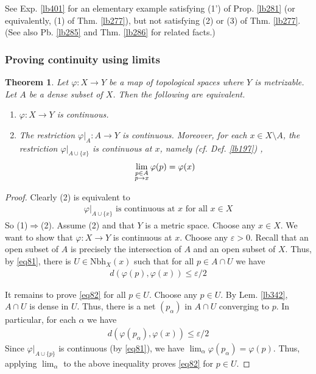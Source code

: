 \documentclass[12pt,b5paper,notitlepage]{article}
\theoremstyle{definition}
\theoremstyle{plain}
\newtheorem{thm}[df]{Theorem}
\newcommand{\Nbh}{\mathrm{Nbh}}
\newcommand{\eps}{\varepsilon}
\numberwithin{equation}{section}
\begin{document}
See Exp. \ref{lb401} for an elementary example satisfying (1') of Prop. \ref{lb281} (or equivalently, (1) of Thm. \ref{lb277}), but not satisfying (2) or (3) of Thm. \ref{lb277}. (See also Pb. \ref{lb285} and Thm. \ref{lb286} for related facts.)






\subsubsection{Proving continuity using limits}



\begin{thm}\label{lb276}
Let $\varphi:X\rightarrow Y$ be a map of topological spaces where $Y$ is metrizable. Let $A$ be a dense subset of $X$. Then the following are equivalent.
\begin{enumerate}[label=(\arabic*)]
\item $\varphi:X\rightarrow Y$ is continuous.
\item The restriction $\varphi|_A:A\rightarrow Y$ is continuous. Moreover, for each $x\in X\setminus A$, the restriction $\varphi|_{A\cup\{x\}}$ is continuous at $x$, namely (cf. Def. \ref{lb197}) ,
\begin{align}
\lim_{
\begin{subarray}{c}
p\in A\\
p\rightarrow x
\end{subarray}
}\varphi(p)=\varphi(x)
\end{align}
\end{enumerate}
\end{thm}




\begin{proof}
Clearly (2) is equivalent to
\begin{align}\label{eq81}
\varphi|_{A\cup\{x\}}\text{ is continuous at $x$ for all $x\in X$}
\end{align}
So (1)$\Rightarrow$(2). Assume (2) and that $Y$ is a metric space. Choose any $x\in X$. We want to show that $\varphi:X\rightarrow Y$ is continuous at $x$. Choose any $\eps>0$. Recall that an open subset of $A$ is precisely the intersection of $A$ and an open subset of $X$. Thus, by \eqref{eq81}, there is $U\in\Nbh_X(x)$ such that for all $p\in A\cap U$ we have
\begin{align}
d(\varphi(p),\varphi(x))\leq \eps/2\label{eq82}
\end{align}


It remains to prove \eqref{eq82} for all $p\in U$. Choose any $p\in U$. By Lem. \ref{lb342}, $A\cap U$ is dense in $U$.  Thus, there is a net $(p_\alpha)$ in $A\cap U$ converging to $p$. In particular, for each $\alpha$ we have
\begin{align*}
d(\varphi(p_\alpha),\varphi(x))\leq \eps/2
\end{align*}
Since $\varphi|_{A\cup\{p\}}$ is continuous (by \eqref{eq81}), we have $\lim_\alpha\varphi(p_\alpha)=\varphi(p)$. Thus, applying $\lim_\alpha$ to the above inequality proves \eqref{eq82} for $p\in U$.
\end{proof}
\end{document}
